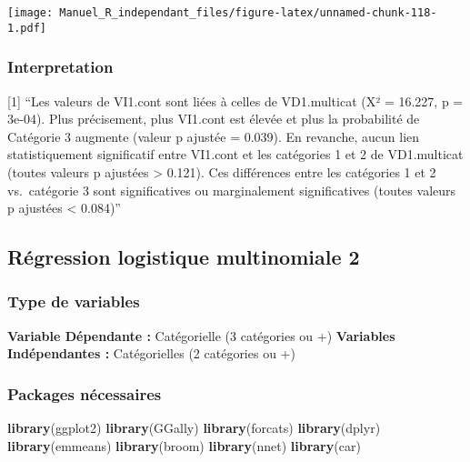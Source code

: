 \documentclass[
]{book}
\newenvironment{Shaded}{\begin{snugshade}}{\end{snugshade}}
\newcommand{\KeywordTok}[1]{\textcolor[rgb]{0.13,0.29,0.53}{\textbf{#1}}}
\newcommand{\NormalTok}[1]{#1}
\begin{document}
\texttt{[image: Manuel\_R\_independant\_files/figure-latex/unnamed-chunk-118-1.pdf]}

\hypertarget{interpretation-13}{%
\subsubsection{Interpretation}\label{interpretation-13}}

{[}1{]} ``Les valeurs de VI1.cont sont liées à celles de VD1.multicat (X² = 16.227, p = 3e-04). Plus précisement, plus VI1.cont est élevée et plus la probabilité de Catégorie 3 augmente (valeur p ajustée = 0.039). En revanche, aucun lien statistiquement significatif entre VI1.cont et les catégories 1 et 2 de VD1.multicat (toutes valeurs p ajustées \textgreater{} 0.121). Ces différences entre les catégories 1 et 2 vs.~catégorie 3 sont significatives ou marginalement significatives (toutes valeurs p ajustées \textless{} 0.084)''

\hypertarget{ruxe9gression-logistique-multinomiale-2}{%
\subsection{Régression logistique multinomiale 2}\label{ruxe9gression-logistique-multinomiale-2}}

\hypertarget{type-de-variables-14}{%
\subsubsection{Type de variables}\label{type-de-variables-14}}

\textbf{Variable Dépendante :} Catégorielle (3 catégories ou +)
\textbf{Variables Indépendantes :} Catégorielles (2 catégories ou +)

\hypertarget{packages-nuxe9cessaires-14}{%
\subsubsection{Packages nécessaires}\label{packages-nuxe9cessaires-14}}

\begin{Shaded}
\begin{Highlighting}[]
\KeywordTok{library}\NormalTok{(ggplot2)}
\KeywordTok{library}\NormalTok{(GGally)}
\KeywordTok{library}\NormalTok{(forcats)}
\KeywordTok{library}\NormalTok{(dplyr)}
\KeywordTok{library}\NormalTok{(emmeans)}
\KeywordTok{library}\NormalTok{(broom)}
\KeywordTok{library}\NormalTok{(nnet)}
\KeywordTok{library}\NormalTok{(car)}
\end{Highlighting}
\end{Shaded}
\end{document}
